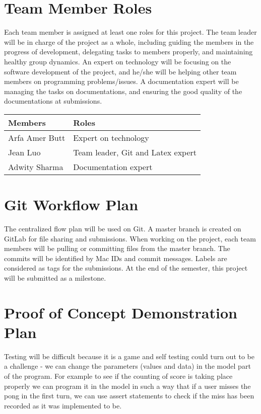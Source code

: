 \documentclass{article}
\begin{document}
\section  {Team Member Roles}

Each team member is assigned at least one roles for this project. The team leader will be in charge of the project as a whole, including guiding the members in the progress of development, delegating tasks to members properly, and maintaining healthy group dynamics. An expert on technology will be focusing on the software development of the project, and he/she will be helping other team members on programming problems/issues. A documentation expert will be managing the tasks on documentations, and ensuring the good quality of the documentations at submissions.\\

\begin{tabular}{|p{3cm}|p{8cm}|}
\hline
\textbf{Members}    & \textbf{Roles}                                                                                                                                                                                                                                                                                                                                                                                                                                \\\hline
Arfa Amer Butt       & Expert on technology \\\hline
Jean Luo   & Team leader, Git and Latex expert \\\hline
Adwity Sharma   & Documentation expert \\\hline
\end{tabular}

\section  { Git Workflow Plan}

The centralized flow plan will be used on Git. A master branch is created on GitLab for file sharing and submissions. When working on the project, each team members will be pulling or committing files from the master branch. The commits will be identified by Mac IDs and commit messages. Labels are considered as tags for the submissions. At the end of the semester, this project will be submitted as a milestone.\\

\section  {Proof of Concept Demonstration Plan}
Testing will be difficult because it is a game and self testing could turn out to be a challenge - we can change the parameters (values and data) in the model part of the program. For example to see if the counting of score is taking place properly we can program it in the model in such a way that if a user misses the pong in the first turn, we can use assert statements to check if the miss has been recorded as it was implemented to be.\\
\end{document}
